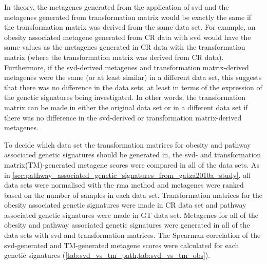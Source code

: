 In theory, the metagenes generated from the application of \gls{svd} and the metagenes generated from transformation matrix would be exactly the same if the transformation matrix was derived from the same data set.
For example, an obesity associated metagene generated from CR data with \gls{svd} would have the same values as the metagenes generated in CR data with the transformation matrix (where the transformation matrix was derived from CR data).
Furthermore, if the \gls{svd}-derived metagenes and transformation matrix-derived metagenes were the same (or at least similar) in a different data set, this suggests that there was no difference in the data sets, at least in terms of the expression of the genetic signatures being investigated.
In other words, the transformation matrix can be made in either the original data set or in a different data set if there was no difference in the \gls{svd}-derived or transformation matrix-derived metagenes.

To decide which data set the transformation matrices for obesity and pathway associated genetic signatures should be generated in, the \gls{svd}- and transformation matrix(TM)-generated metagene scores were compared in all of the data sets.
As in \cref{sec:pathway_associated_genetic_signatures_from_gatza2010a_study}, all data sets were normalised with the \gls{rma} method and metagenes were ranked based on the number of samples in each data set.
Transformation matrices for the obesity associated genetic signatures were made in CR data set and pathway associated genetic signatures were made in GT data set.
Metagenes for all of the obesity and pathway associated genetic signatures were generated in all of the data sets with \gls{svd} and transformation matrices.
The Spearman correlation of the \gls{svd}-generated and TM-generated metagene scores were calculated for each genetic signatures (\cref{tab:svd_vs_tm_path,tab:svd_vs_tm_obs}).

